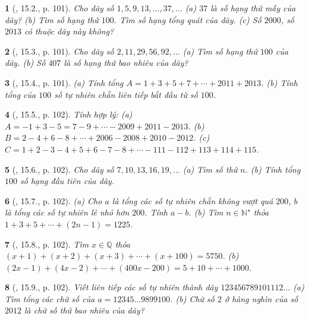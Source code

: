 \documentclass{article}
\newtheorem{baitoan}{}
\begin{document}
\begin{baitoan}[\cite{TLCT_THCS_Toan_6_so_hoc}, 15.2., p. 101]
	Cho dãy số $1,5,9,13,\ldots,37,\ldots$ (a) $37$ là số hạng thứ mấy của dãy? (b) Tìm số hạng thứ $100$. Tìm số hạng tổng quát của dãy. (c) Số $2000$, số $2013$ có thuộc dãy này không?
\end{baitoan}

\begin{baitoan}[\cite{TLCT_THCS_Toan_6_so_hoc}, 15.3., p. 101]
	Cho dãy số $2,11,29,56,92,\ldots$ (a) Tìm số hạng thứ $100$ của dãy. (b) Số $407$ là số hạng thứ bao nhiêu của dãy?
\end{baitoan}

\begin{baitoan}[\cite{TLCT_THCS_Toan_6_so_hoc}, 15.4., p. 101]
	(a) Tính tổng $A = 1 + 3 + 5 + 7 + \cdots + 2011 + 2013$. (b) Tính tổng của $100$ số tự nhiên chẵn liên tiếp bắt đầu từ số $100$.
\end{baitoan}

\begin{baitoan}[\cite{TLCT_THCS_Toan_6_so_hoc}, 15.5., p. 102]
	Tính hợp lý: (a) $A = -1 + 3 - 5 = 7 - 9 + \cdots - 2009 + 2011 - 2013$. (b) $B = 2 - 4 + 6 - 8 + \cdots + 2006 - 2008 + 2010 - 2012$. (c) $C = 1 + 2 - 3 - 4 + 5 + 6 - 7 - 8 + \cdots - 111 - 112 + 113 + 114 + 115$.
\end{baitoan}

\begin{baitoan}[\cite{TLCT_THCS_Toan_6_so_hoc}, 15.6., p. 102]
	Cho dãy số $7,10,13,16,19,\ldots$ (a) Tìm số thứ $n$. (b) Tính tổng $100$ số hạng đầu tiên của dãy.
\end{baitoan}

\begin{baitoan}[\cite{TLCT_THCS_Toan_6_so_hoc}, 15.7., p. 102]
	(a) Cho $a$ là tổng các số tự nhiên chẵn không vượt quá $200$, $b$ là tổng các số tự nhiên lẻ nhỏ hơn $200$. Tính $a - b$. (b) Tìm $n\in\mathbb{N}^\star$ thỏa $1 + 3 + 5 + \cdots + (2n - 1) = 1225$.
\end{baitoan}

\begin{baitoan}[\cite{TLCT_THCS_Toan_6_so_hoc}, 15.8., p. 102]
	Tìm $x\in\mathbb{Q}$ thỏa $(x + 1) + (x + 2) + (x + 3) + \cdots + (x + 100) = 5750$. (b) $(2x - 1) + (4x - 2) + \cdots + (400x - 200) = 5 + 10 + \cdots + 1000$.
\end{baitoan}

\begin{baitoan}[\cite{TLCT_THCS_Toan_6_so_hoc}, 15.9., p. 102]
	Viết liên tiếp các số tự nhiên thành dãy $123456789101112\ldots$ (a) Tìm tổng các chữ số của $a = 12345\ldots9899100$. (b) Chữ số $2$ ở hàng nghìn của số $2012$ là chữ số thứ bao nhiêu của dãy?
\end{baitoan}
\end{document}
